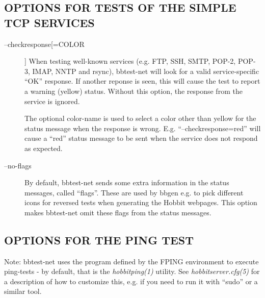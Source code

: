 \subsection{OPTIONS FOR TESTS OF THE SIMPLE TCP SERVICES}
\begin{description}
\item[--checkresponse[=COLOR]] When testing well-known services
  (e.g. FTP, SSH, SMTP, POP-2, POP-3, IMAP, NNTP and rsync),
  bbtest-net will look for a valid service-specific ``OK''
  response. If another reponse is seen, this will cause the test to
  report a warning (yellow) status. Without this option, the response
  from the service is ignored.  

 The optional color-name is used to select a color other than yellow
 for the status message when the response is
 wrong. E.g. ``--checkresponse=red'' will cause a ``red'' status
 message to be sent when the service does not respond as expected. 


 

\item[--no-flags] By default, bbtest-net sends some extra information
  in the status messages, called ``flags''. These are used by bbgen
  e.g. to pick different icons for reversed tests when generating the
  Hobbit webpages. This option makes bbtest-net omit these flags from
  the status messages. 



\end{description}

\subsection{OPTIONS FOR THE PING TEST}
 Note: bbtest-net uses the program defined by the FPING environment to
 execute ping-tests - by default, that is the \emph{hobbitping(1)}
 utility. See \emph{hobbitserver.cfg(5)} for a description of how to
 customize this, e.g. if you need to run it with ``sudo'' or a similar
 tool. 



